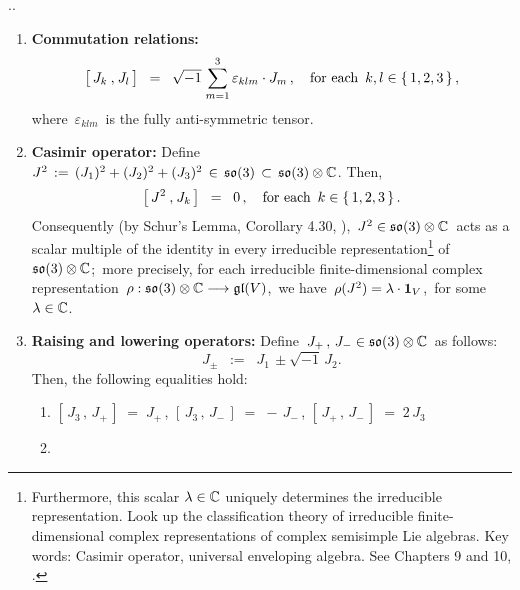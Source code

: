 \begin{proposition}
{\color{white}.}\vskip -0.5cm{\color{white}.}
\begin{enumerate}
\item
	\textbf{Commutation relations:}\;\;
	\begin{equation*}
	\left[\,J_{k}\,\overset{{\color{white}1}}{,}\,J_{l}\,\right]
	\;\; = \;\;
		\sqrt{-1}\;\overset{3}{\underset{m=1}{\sum}}\,\varepsilon_{klm}\cdot J_{m}\,,
	\quad
	\textnormal{for each \,$k, l \in \{\,1,2,3\,\}$}\,,
	\end{equation*}
	where \,$\varepsilon_{klm}$\, is the fully anti-symmetric tensor.
\item
	\textbf{Casimir operator:}\;\;
	Define \,$J^{2} \, := \, (J_{1})^{2} + (J_{2})^{2} + (J_{3})^{2} \,\in\, \mathfrak{so}(3) \,\subset\, \mathfrak{so}(3) \otimes \mathbb{C}$.
	Then,
	\begin{equation*}
	\left[\,J^{2}\,\overset{{\color{white}1}}{,}\,J_{k}\,\right]
	\;\; = \;\;
		0\,,
	\quad
	\textnormal{for each \,$k \in \{\,1,2,3\,\}$}\,.
	\end{equation*}
	Consequently (by Schur's Lemma, Corollary 4.30, \cite{Hall2015}), 
	\,$J^{2} \in \mathfrak{so}(3) \otimes \mathbb{C}$\, acts as a scalar multiple of the identity in every irreducible
	representation\footnote{Furthermore, this scalar $\lambda \in \mathbb{C}$ uniquely determines
	the irreducible representation.
	Look up the classification theory of irreducible finite-dimensional complex representations
	of complex semisimple Lie algebras.
	Key words: Casimir operator, universal enveloping algebra. See Chapters 9 and 10, \cite{Hall2015}.}
	of \,$\mathfrak{so}(3) \otimes \mathbb{C}$;\, more precisely, for each irreducible finite-dimensional
	complex representation
	\,$\rho : \mathfrak{so}(3) \otimes \mathbb{C} \longrightarrow \mathfrak{gl}(V)$,\,
	we have \,$\rho(J^{2}) = \lambda \cdot \textnormal{\textbf{1}}_{V}$,\,
	for some \,$\lambda \in \mathbb{C}$.
\item
	\textbf{Raising and lowering operators:}\;\; Define \,$J_{+}\,,\, J_{-} \in \mathfrak{so}(3)\otimes\mathbb{C}$\, as follows:
	\begin{equation*}
	J_{\pm} \;\; := \;\; J_{1} \, \pm \sqrt{-1}\,J_{2}.
	\end{equation*}
	Then, the following equalities hold:
	\begin{enumerate}
	\item
		$\left[\,J_{3}\,,\,J_{+}\,\right] \;=\; J_{+}$\,,
		\quad
		$\left[\,J_{3}\,,\,J_{-}\,\right] \;=\; -\,J_{-}$\,,
		\quad
		$\left[\,J_{+}\,,\,J_{-}\,\right] \;=\; 2\,J_{3}$
	\item

\end{enumerate}
\end{enumerate}
\end{proposition}
